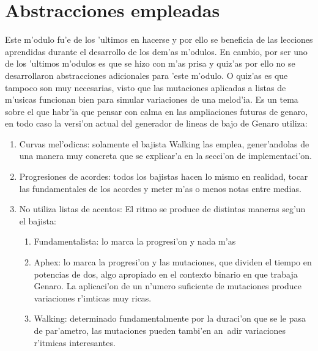 \section{Abstracciones empleadas}
Este m'odulo fu'e de los 'ultimos en hacerse y por ello se beneficia de las lecciones aprendidas durante el desarrollo de los dem'as m'odulos. En cambio, por ser uno de los 'ultimos m'odulos es que se hizo con m'as prisa y quiz'as por ello no se desarrollaron abstracciones adicionales para 'este m'odulo. O quiz'as es que tampoco son muy necesarias, visto que las mutaciones aplicadas a listas de m'usicas funcionan bien para simular variaciones de una melod'ia. Es un tema sobre el que habr'ia que pensar con calma en las ampliaciones futuras de genaro, en todo caso la versi'on actual del generador de lineas de bajo de Genaro utiliza:
        \begin{enumerate}
        \item Curvas mel'odicas: solamente el bajista Walking las emplea, gener'andolas de una manera muy concreta que se explicar'a en la secci'on de implementaci'on.
        \item Progresiones de acordes: todos los bajistas hacen lo mismo en realidad, tocar las fundamentales de los acordes y meter m'as o menos notas entre medias.
        \item No utiliza listas de acentos: El ritmo se produce de distintas maneras seg'un el bajista:
                \begin{enumerate} 
                \item Fundamentalista: lo marca la progresi'on y nada m'as
                \item Aphex: lo marca la progresi'on y las mutaciones, que dividen el tiempo en potencias de dos, algo apropiado en el contexto binario en que trabaja Genaro. La aplicaci'on de un n'umero suficiente de mutaciones produce variaciones r'imticas muy ricas.
                \item Walking: determinado fundamentalmente por la duraci'on que se le pasa de par'ametro, las mutaciones pueden tambi'en an~adir variaciones r'itmicas interesantes.
                \end{enumerate}
        \end{enumerate}

